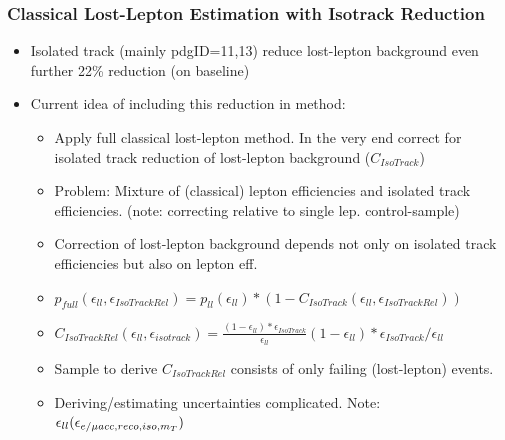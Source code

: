 \documentclass{beamer}
\begin{document}
\begin{frame}
 \frametitle{Classical Lost-Lepton Estimation with Isotrack Reduction}
 \begin{itemize}
  \item Isolated track (mainly pdgID=11,13) reduce lost-lepton background even further 22\% reduction (on baseline)
  \item Current idea of including this reduction in method:
  \begin{itemize}
   \item Apply full classical lost-lepton method. In the very end correct for isolated track reduction of lost-lepton background ($C_{IsoTrack}$)
   \item Problem: Mixture of (classical) lepton efficiencies and isolated track efficiencies. (note: correcting relative to single lep. control-sample)
   \item Correction of lost-lepton background depends not only on isolated track efficiencies but also on lepton eff.
   \item $p_{full}(\epsilon_{ll},\epsilon_{IsoTrackRel}) = p_{ll}(\epsilon_{ll}) * (1-C_{IsoTrack}(\epsilon_{ll},\epsilon_{IsoTrackRel}))$
   \item $C_{IsoTrackRel}(\epsilon_{ll},\epsilon_{isotrack}) = \frac{(1-\epsilon_{ll}) * \epsilon_{IsoTrack}}{\epsilon_{ll}} (1-\epsilon_{ll}) * \epsilon_{IsoTrack} / \epsilon_{ll}$
   \item Sample to derive $C_{IsoTrackRel}$ consists of only failing (lost-lepton) events.
   \item Deriving/estimating uncertainties complicated. Note: $\epsilon_{ll}(\epsilon_{e/\mu acc,reco,iso,m_{T}})$
  \end{itemize}

 \end{itemize}

\end{frame}
\end{document}
